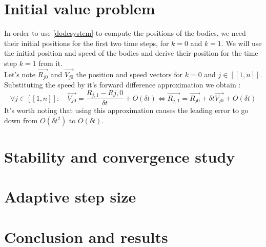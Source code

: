 \documentclass[a4paper,11pt]{article}
\begin{document}
\section{Initial value problem}
In order to use \eqref{dodesystem} to compute the positions of the bodies, we need their
initial positions for the first two time steps, for $k = 0$ and $k = 1$.
We will use the initial position and speed of the bodies and derive their position
for the time step $k = 1$ from it.\\
Let's note $\vec{R_{j0}}$ and $\vec{V_{j0}}$ the
position and speed vectors for $k=0$ and \linebreak[4] $j \in [[1, n]]$.
Substituting the speed by it's forward difference approximation we obtain :
\begin{equation}
  \forall j \in [[1, n]]: \quad
  \vec{V_{j0}} = \frac{R_{j,1} - R{j, 0}}{\delta t} + O(\delta t)
  \Leftrightarrow
  \vec{R_{j,1}} = \vec{R_{j0}} + \delta t \vec{V_{j0}} + O(\delta t)
\end{equation}
It's worth noting that using this approximation causes the leading error to go
down from $O(\delta t^2)$ to $O(\delta t)$.
\section{Stability and convergence study}
\section{Adaptive step size}
\section{Conclusion and results}
\end{document}
